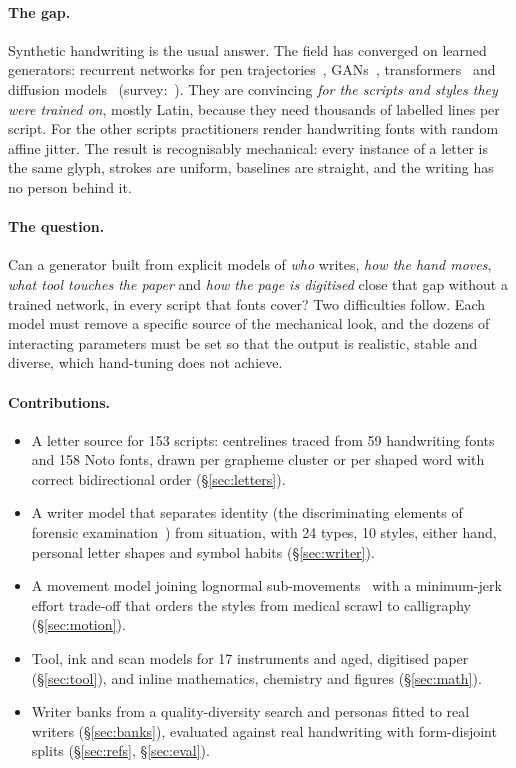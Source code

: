 \documentclass[10pt,twocolumn]{article}
\begin{document}
\paragraph{The gap.} Synthetic handwriting is the usual answer. The field has converged on learned generators:
recurrent networks for pen trajectories~\cite{graves2013}, GANs~\cite{fogel2020,kang2020},
transformers~\cite{bhunia2021,pippi2023} and diffusion models~\cite{nikolaidou2023,nikolaidou2024}
(survey:~\cite{diaz2025}). They are convincing \emph{for the scripts and styles they were trained on}, mostly Latin,
because they need thousands of labelled lines per script. For the other scripts practitioners render handwriting
fonts with random affine jitter. The result is recognisably mechanical: every instance of a letter is the same
glyph, strokes are uniform, baselines are straight, and the writing has no person behind it.

\paragraph{The question.} Can a generator built from explicit models of \emph{who} writes, \emph{how the hand
moves}, \emph{what tool touches the paper} and \emph{how the page is digitised} close that gap without a trained
network, in every script that fonts cover? Two difficulties follow. Each model must remove a specific source of the
mechanical look, and the dozens of interacting parameters must be set so that the output is realistic, stable and
diverse, which hand-tuning does not achieve.

\paragraph{Contributions.}
\begin{itemize}\setlength\itemsep{1pt}
\item A letter source for 153 scripts: centrelines traced from 59 handwriting fonts and 158 Noto fonts, drawn per
grapheme cluster or per shaped word with correct bidirectional order (\S\ref{sec:letters}).
\item A writer model that separates identity (the discriminating elements of forensic
examination~\cite{huber1999}) from situation, with 24 types, 10 styles, either hand, personal letter shapes and
symbol habits (\S\ref{sec:writer}).
\item A movement model joining lognormal sub-movements~\cite{plamondon1995} with a minimum-jerk~\cite{flash1985}
effort trade-off that orders the styles from medical scrawl to calligraphy (\S\ref{sec:motion}).
\item Tool, ink and scan models for 17 instruments and aged, digitised paper (\S\ref{sec:tool}), and inline
mathematics, chemistry and figures (\S\ref{sec:math}).
\item Writer banks from a quality-diversity search and personas fitted to real writers (\S\ref{sec:banks}),
evaluated against real handwriting with form-disjoint splits (\S\ref{sec:refs}, \S\ref{sec:eval}).
\end{itemize}
\end{document}
